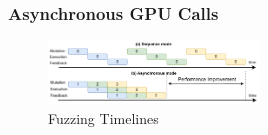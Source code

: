 
%





\subsubsection{Asynchronous GPU Calls}

\begin{figure}[t]
\centerline{\includegraphics[width=0.5\textwidth]{images/GFL-async_cpy.drawio.pdf}}
\caption{Fuzzing Timelines}
\vspace{-0.1in}
\label{fig:async_cpy}
\end{figure}

